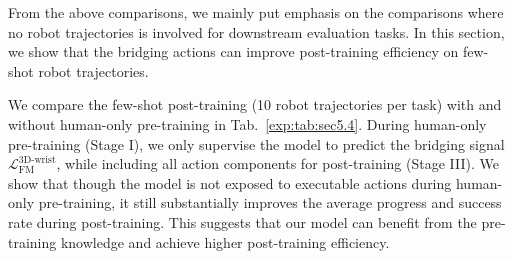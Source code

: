 From the above comparisons, we mainly put emphasis on the comparisons where no robot trajectories is involved for downstream evaluation tasks.
% 
In this section, we show that the bridging actions can improve post-training efficiency on few-shot robot trajectories.


We compare the few-shot post-training (10 robot trajectories per task) with and without human-only pre-training in Tab.~\ref{exp:tab:sec5.4}.
% 
During human-only pre-training (Stage I), we only supervise the model to predict the bridging signal $\mathcal{L}_{\text{FM}}^{\text{3D-wrist}}$, while including all action components for post-training (Stage III).
% 
We show that though the model is not exposed to executable actions during human-only pre-training, it still substantially improves the average progress and success rate during post-training.
% 
This suggests that our model can benefit from the pre-training knowledge and achieve higher post-training efficiency.


\begin{table}[htbp]
\centering
\caption{
    \textbf{Post-training data efficiency comparison after human-only pre-training.}
    Though the model is only exposed to non-executable human actions $\mathbf{a}_{t}^{\text{3D-wrist}}$ during pre-training, we can efficiently improve the data efficiency for few-shot robot post-training.
}
\label{exp:tab:sec5.4}
\end{table}








